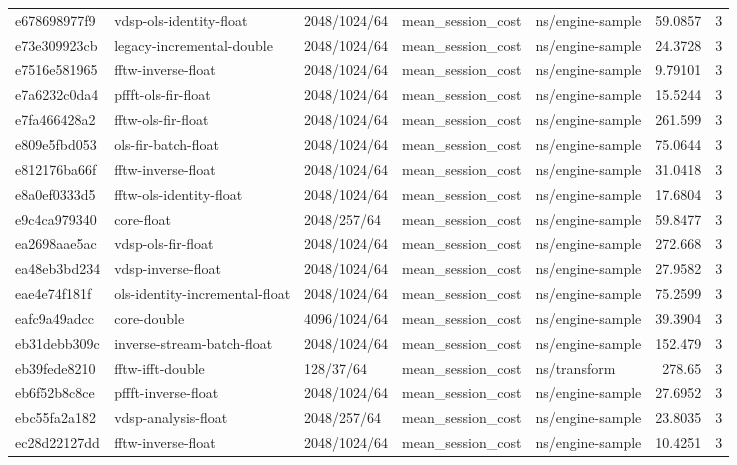 \begin{longtable}{lllllrr}
e678698977f9 & vdsp-ols-identity-float & 2048/1024/64 & mean\_session\_cost & ns/engine-sample & 59.0857 & 3 \\
e73e309923cb & legacy-incremental-double & 2048/1024/64 & mean\_session\_cost & ns/engine-sample & 24.3728 & 3 \\
e7516e581965 & fftw-inverse-float & 2048/1024/64 & mean\_session\_cost & ns/engine-sample & 9.79101 & 3 \\
e7a6232c0da4 & pffft-ols-fir-float & 2048/1024/64 & mean\_session\_cost & ns/engine-sample & 15.5244 & 3 \\
e7fa466428a2 & fftw-ols-fir-float & 2048/1024/64 & mean\_session\_cost & ns/engine-sample & 261.599 & 3 \\
e809e5fbd053 & ols-fir-batch-float & 2048/1024/64 & mean\_session\_cost & ns/engine-sample & 75.0644 & 3 \\
e812176ba66f & fftw-inverse-float & 2048/1024/64 & mean\_session\_cost & ns/engine-sample & 31.0418 & 3 \\
e8a0ef0333d5 & fftw-ols-identity-float & 2048/1024/64 & mean\_session\_cost & ns/engine-sample & 17.6804 & 3 \\
e9c4ca979340 & core-float & 2048/257/64 & mean\_session\_cost & ns/engine-sample & 59.8477 & 3 \\
ea2698aae5ac & vdsp-ols-fir-float & 2048/1024/64 & mean\_session\_cost & ns/engine-sample & 272.668 & 3 \\
ea48eb3bd234 & vdsp-inverse-float & 2048/1024/64 & mean\_session\_cost & ns/engine-sample & 27.9582 & 3 \\
eae4e74f181f & ols-identity-incremental-float & 2048/1024/64 & mean\_session\_cost & ns/engine-sample & 75.2599 & 3 \\
eafc9a49adcc & core-double & 4096/1024/64 & mean\_session\_cost & ns/engine-sample & 39.3904 & 3 \\
eb31debb309c & inverse-stream-batch-float & 2048/1024/64 & mean\_session\_cost & ns/engine-sample & 152.479 & 3 \\
eb39fede8210 & fftw-ifft-double & 128/37/64 & mean\_session\_cost & ns/transform & 278.65 & 3 \\
eb6f52b8c8ce & pffft-inverse-float & 2048/1024/64 & mean\_session\_cost & ns/engine-sample & 27.6952 & 3 \\
ebc55fa2a182 & vdsp-analysis-float & 2048/257/64 & mean\_session\_cost & ns/engine-sample & 23.8035 & 3 \\
ec28d22127dd & fftw-inverse-float & 2048/1024/64 & mean\_session\_cost & ns/engine-sample & 10.4251 & 3 \\

\end{longtable}
